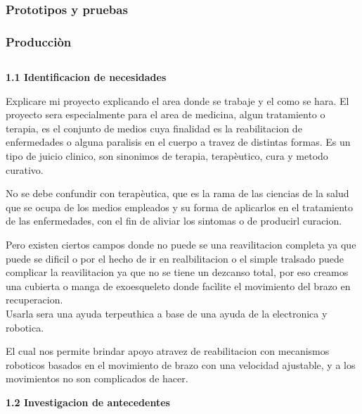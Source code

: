 \documentclass[12pt,letterpaper]{report}
\begin{document}
\section{Prototipos y pruebas}
\section{Producciòn} 


\begin{flushleft}
\begin{flushleft}
\part{}

\textbf{1.1 Identificacion de necesidades}
\end{flushleft}
\begin{flushleft}
Explicare mi proyecto explicando el area donde se trabaje y el como se hara. El proyecto sera especialmente para el area de medicina, algun tratamiento o terapia, es el conjunto de medios cuya finalidad es la reabilitacion de enfermedades o alguna paralisis en el cuerpo a travez de distintas formas. Es un tipo de juicio clinico, son sinonimos de terapia, terapèutico, cura y metodo curativo.
\begin{flushleft}
No se debe confundir con terapèutica, que es la rama de las ciencias de la salud que se ocupa de los medios empleados y su forma de aplicarlos en el tratamiento de las enfermedades, con el fin de aliviar los sintomas o de producirl curacion.
\begin{flushleft}
Pero existen ciertos campos donde no puede se una reavilitacion completa ya que puede se dificil o por el hecho de ir en realbilitacion o el simple tralsado puede complicar la reavilitacion ya que no se tiene un dezcanso total, por eso creamos una cubierta o manga de exoesqueleto donde facìlite el movimiento del brazo en recuperacion.\\
Usarla sera una ayuda terpeuthica a base de una ayuda de la electronica y robotica.
\begin{flushleft}
El cual nos permite brindar apoyo atravez de  reabilitacion con mecanismos roboticos basados en el movimiento de brazo con una velocidad ajustable, y a los movimientos no son complicados de hacer.
\begin{flushleft}
\textbf{1.2 Investigacion de antecedentes}
\begin{flushleft}

\end{flushleft}
\end{flushleft}
\end{flushleft}
\end{flushleft}
\end{flushleft}
\end{flushleft}
\end{flushleft}
\end{document}
